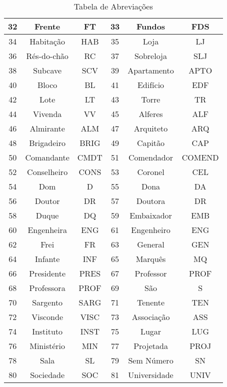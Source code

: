 \begin{anexosenv}
\begin{table}[h!]
\begin{tabular}{|c|c|c|c|c|c|}
    32 & Frente        & FT    & 33 & Fundos        & FDS   \\ \hline
    34 & Habitação     & HAB   & 35 & Loja          & LJ    \\ \hline
    36 & Rés-do-chão   & RC    & 37 & Sobreloja     & SLJ   \\ \hline
    38 & Subcave       & SCV   & 39 & Apartamento   & APTO  \\ \hline
    40 & Bloco         & BL    & 41 & Edifício      & EDF   \\ \hline
    42 & Lote          & LT    & 43 & Torre         & TR    \\ \hline
    44 & Vivenda       & VV    & 45 & Alferes       & ALF   \\ \hline
    46 & Almirante     & ALM   & 47 & Arquiteto     & ARQ   \\ \hline
    48 & Brigadeiro    & BRIG  & 49 & Capitão       & CAP   \\ \hline
    50 & Comandante    & CMDT  & 51 & Comendador    & COMEND \\ \hline
    52 & Conselheiro   & CONS  & 53 & Coronel       & CEL   \\ \hline
    54 & Dom           & D     & 55 & Dona          & DA    \\ \hline
    56 & Doutor        & DR    & 57 & Doutora       & DR    \\ \hline
    58 & Duque         & DQ    & 59 & Embaixador    & EMB   \\ \hline
    60 & Engenheira    & ENG   & 61 & Engenheiro    & ENG   \\ \hline
    62 & Frei          & FR    & 63 & General       & GEN   \\ \hline
    64 & Infante       & INF   & 65 & Marquês       & MQ    \\ \hline
    66 & Presidente    & PRES  & 67 & Professor     & PROF  \\ \hline
    68 & Professora    & PROF  & 69 & São           & S     \\ \hline
    70 & Sargento      & SARG  & 71 & Tenente       & TEN   \\ \hline
    72 & Visconde      & VISC  & 73 & Associação    & ASS   \\ \hline
    74 & Instituto     & INST  & 75 & Lugar         & LUG   \\ \hline
    76 & Ministério    & MIN   & 77 & Projetada     & PROJ  \\ \hline
    78 & Sala          & SL    & 79 & Sem Número    & SN    \\ \hline
    80 & Sociedade     & SOC   & 81 & Universidade  & UNIV  \\ \hline
    \end{tabular}
    \caption{Tabela de Abreviações}
    \label{tab:abreviacoes}
\end{table}
    


\end{anexosenv}
